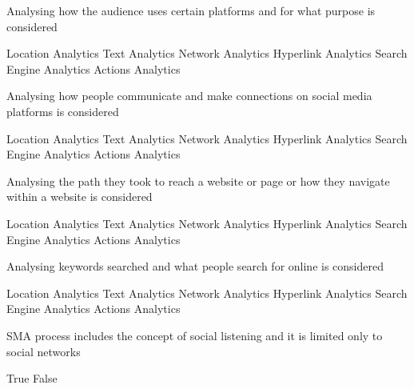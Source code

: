\documentclass[theme=sleek, randomorder, hidesidemenu]{webquiz}
\begin{document}
\begin{question}

  Analysing how the audience uses certain platforms and for what purpose is considered

  \begin{choice}[columns=2]
    \incorrect Location Analytics
    \incorrect Text Analytics
    \incorrect Network Analytics
    \incorrect Hyperlink Analytics
    \incorrect Search Engine Analytics
    \correct Actions Analytics
  \end{choice}

\end{question}

\begin{question}
  Analysing how people communicate and make connections on social media platforms is considered
  \begin{choice}[columns=2]
    \incorrect Location Analytics
    \incorrect Text Analytics
    \correct Network Analytics
    \incorrect Hyperlink Analytics
    \incorrect Search Engine Analytics
    \incorrect Actions Analytics
  \end{choice}
\end{question}

\begin{question}
  Analysing the path they took to reach a website or page or how they navigate within a website is considered
  \begin{choice}[columns=2]
    \incorrect Location Analytics
    \incorrect Text Analytics
    \incorrect Network Analytics
    \correct Hyperlink Analytics
    \incorrect Search Engine Analytics
    \incorrect Actions Analytics
  \end{choice}
\end{question}

\begin{question}
  Analysing keywords searched and what people search  for online is considered
  \begin{choice}[columns=2]
    \incorrect Location Analytics
    \incorrect Text Analytics
    \incorrect Network Analytics
    \incorrect Hyperlink Analytics
    \correct Search Engine Analytics
    \incorrect Actions Analytics
  \end{choice}
\end{question}

\begin{question}
  SMA process includes the concept of social listening and it is limited only to social networks

  \begin{choice}[columns=2]
    \incorrect True
    \correct False
  \end{choice}
\end{question}
\end{document}

